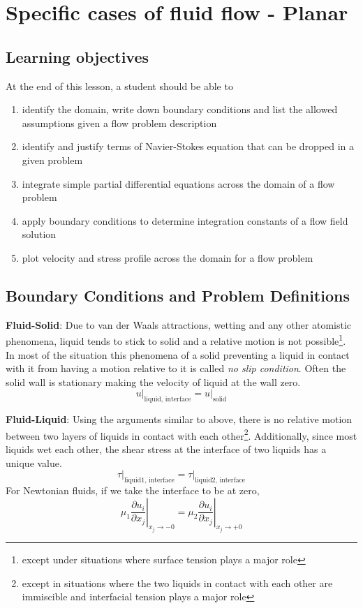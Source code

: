 \chapter{Specific cases of fluid flow - Planar}
\label{ch:flowprob}

\section{Learning objectives}

At the end of this lesson, a student should be able to

\begin{enumerate}
\item identify the domain, write down boundary conditions and list the allowed assumptions given a flow problem description
\item identify and justify terms of Navier-Stokes equation that can be dropped in a given problem
\item integrate simple partial differential equations across the domain of a flow problem
\item apply boundary conditions to determine integration constants of a flow field solution
\item plot velocity and stress profile across the domain for a flow problem
\end{enumerate}

\section{Boundary Conditions and Problem Definitions}

{\bf Fluid-Solid}: Due to van der Waals attractions, wetting and any other atomistic phenomena, liquid tends to stick to solid and a relative motion is not possible\footnote{except under situations where surface tension plays a major role}. In most of the situation this phenomena of a solid preventing a liquid in contact with it from having a motion relative to it is called \textit{no slip condition}. Often the solid wall is stationary making the velocity of liquid at the wall zero.
$$\left. u \right|_{\text{liquid, interface}} = \left. u \right|_{\text{solid}}$$

{\bf Fluid-Liquid}: Using the arguments similar to above, there is no relative motion between two layers of liquids in contact with each other\footnote{except in situations where the two liquids in contact with each other are immiscible and interfacial tension plays a major role}. Additionally, since most liquids wet each other, the shear stress at the interface of two liquids has a unique value. 
$$\left. \tau\right|_{\text{liquid1, interface}} = \left. \tau\right|_{\text{liquid2, interface}}$$
For Newtonian fluids, if we take the interface to be at zero,
$$\left. \mu_1 \frac{\partial u_i}{\partial x_j}\right|_{x_j \rightarrow -0} = \left.\mu_2 \frac{\partial u_i}{\partial x_j}\right|_{x_j \rightarrow +0} $$


